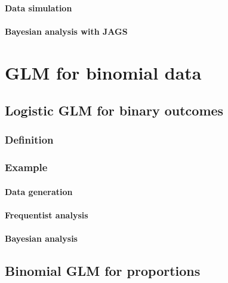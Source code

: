 \documentclass[
  13,
  letterpaper,
]{report}
\begin{document}
\subsubsection{Data simulation}\label{sec-glm1-nb-zi-sim}

\subsubsection{Bayesian analysis with JAGS}\label{sec-glm1-zi-ex-jags}

\chapter{GLM for binomial data}\label{sec-glm2}

\section{Logistic GLM for binary outcomes}\label{sec-glm2-logistic}

\subsection{Definition}\label{sec-glm2-logistic-def}

\subsection{Example}\label{sec-glm2-logistic-ex}

\subsubsection{Data generation}\label{sec-glm2-logistic-ex-sim}

\subsubsection{Frequentist analysis}\label{sec-glm2-logistic-ex-freq}

\subsubsection{Bayesian analysis}\label{sec-glm2-logistic-ex-bayes}

\section{Binomial GLM for proportions}\label{sec-glm2-binom}
\end{document}
